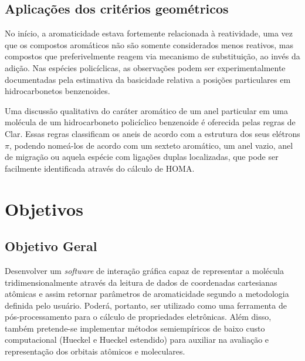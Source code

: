 \section{Aplicações dos critérios geométricos}

No início, a aromaticidade estava fortemente relacionada à reatividade, uma vez que os compostos aromáticos não são somente considerados menos reativos, mas compostos que preferivelmente reagem via mecanismo de substituição, ao invés da adição. Nas espécies policíclicas, as observações podem ser experimentalmente documentadas pela estimativa da basicidade relativa a posições particulares em hidrocarbonetos benzenoides.

Uma discussão qualitativa do caráter aromático de um anel particular em uma molécula de um hidrocarboneto policíclico benzenoide é oferecida pelas regras de Clar. Essas regras classificam os aneis de acordo com a estrutura dos seus elétrons $\pi$, podendo nomeá-los de acordo com um sexteto aromático, um anel vazio, anel de migração ou aquela espécie com ligações duplas localizadas, que pode ser facilmente identificada através do cálculo de \gls{HOMA}.




\chapter{Objetivos}

\section{Objetivo Geral}

 Desenvolver um \textit{software} de interação gráfica capaz de representar a molécula tridimensionalmente através da leitura de dados de coordenadas cartesianas atômicas e assim retornar parâmetros de aromaticidade segundo a metodologia definida pelo usuário. Poderá, portanto, ser utilizado como uma ferramenta de pós-processamento para o cálculo de propriedades eletrônicas. Além disso, também pretende-se implementar métodos semiempíricos de baixo custo computacional (Hueckel e Hueckel estendido) para auxiliar na avaliação e representação dos orbitais atômicos e moleculares.

